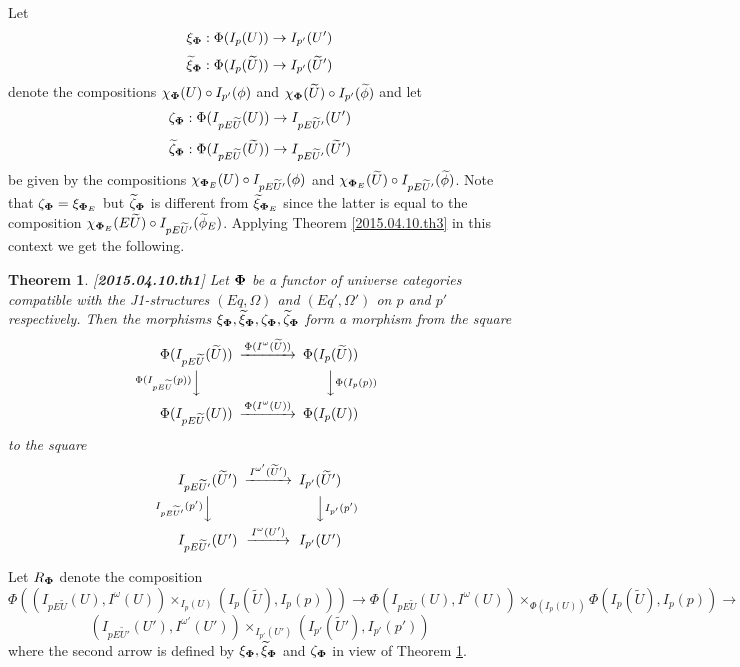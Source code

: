 \documentclass[12pt]{article}
\newtheorem{theorem}[proposition]{Theorem}
\newcommand{\llabel}[1]{\label{#1}[{\bf #1}]}
\newcommand{\sr}{\rightarrow}
\newcommand{\wt}{\widetilde}
\begin{document}
Let 
%
$$\xi_{\bf\Phi}:\Phi(I_p(U))\sr I_{p'}(U')$$
$$\wt{\xi}_{\bf\Phi}:\Phi(I_p(\wt{U}))\sr I_{p'}(\wt{U}')$$
%
denote the compositions $\chi_{\bf\Phi}(U)\circ I_{p'}(\phi)$ and $\chi_{\bf\Phi}(\wt{U})\circ I_{p'}(\wt{\phi})$ and let 
%
$$\zeta_{\bf\Phi}:\Phi(I_{pE\wt{U}}(U))\sr I_{pE\wt{U}'}(U')$$
$$\wt{\zeta}_{\bf\Phi}:\Phi(I_{pE\wt{U}}(\wt{U}))\sr I_{pE\wt{U}'}(\wt{U}')$$
%
be given by the compositions $\chi_{{\bf\Phi}_{E}}(U)\circ I_{pE\wt{U}'}(\phi)$ and $\chi_{{\bf\Phi}_{E}}(\wt{U})\circ I_{pE\wt{U}'}(\wt{\phi})$. Note that $\zeta_{\bf\Phi}=\xi_{{\bf\Phi}_{E}}$ but $\wt{\zeta}_{\bf\Phi}$ is different from $\wt{\xi}_{{\bf\Phi}_{E}}$ since the latter is equal to the composition $\chi_{{\bf\Phi}_{E}}(E\wt{U})\circ I_{pE\wt{U}'}(\wt{\phi}_{E})$. Applying Theorem \ref{2015.04.10.th3} in this context we get the following. 
%
\begin{theorem}
\llabel{2015.04.10.th1}
Let ${\bf\Phi}$ be a functor of universe categories compatible with the J1-structures $(Eq,\Omega)$ and $(Eq',\Omega')$ on $p$ and $p'$ respectively. Then the morphisms $\xi_{\bf\Phi}, \wt{\xi}_{\bf\Phi}, \zeta_{\bf\Phi}, \wt{\zeta}_{\bf\Phi}$ form a morphism from the square
%
$$
\begin{CD}
\Phi(I_{pE\wt{U}}(\wt{U})) @>\Phi(I^{\omega}(\wt{U}))>> \Phi(I_p(\wt{U}))\\
@V\Phi(I_{pE\wt{U}}(p))VV @VV\Phi(I_p(p))V\\
\Phi(I_{pE\wt{U}}(U)) @>\Phi(I^{\omega}(U))>> \Phi(I_p(U))
\end{CD}
$$
%
to the square
%
$$
\begin{CD}
I_{pE\wt{U}'}(\wt{U}') @>I^{\omega'}(\wt{U}')>> I_{p'}(\wt{U}')\\
@VI_{pE\wt{U}'}(p')VV @VVI_{p'}(p')V\\
I_{pE\wt{U}'}(U') @>I^{\omega}(U')>> I_{p'}(U')
\end{CD}
$$
%
\end{theorem}
%
Let $R_{\bf\Phi}$ denote the composition
%
$$\Phi((I_{pE\wt{U}}(U), I^{\omega}(U))\times_{I_p(U)} (I_p(\wt{U}), I_p(p)))\sr \Phi(I_{pE\wt{U}}(U), I^{\omega}(U))\times_{\Phi(I_p(U))}\Phi(I_p(\wt{U}), I_p(p))\sr$$
$$(I_{pE\wt{U}'}(U'),I^{\omega'}(U'))\times_{I_{p'}(U')}(I_{p'}(\wt{U}'),I_{p'}(p'))$$
%
where the second arrow is defined by $\xi_{\bf\Phi}, \wt{\xi}_{\bf\Phi}$ and  $\zeta_{\bf\Phi}$ in view of Theorem \ref{2015.04.10.th1}. 
%
\end{document}
